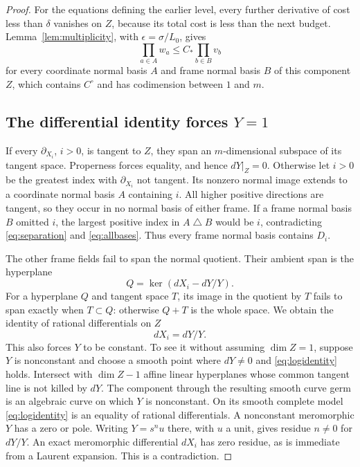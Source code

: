 \documentclass[11pt]{article}
\theoremstyle{definition}
\theoremstyle{remark}
\numberwithin{equation}{section}
\begin{document}
\begin{proof}
For the equations defining the earlier level, every further derivative
of cost less than \(\delta\) vanishes on \(Z\), because its total
cost is less than the next budget. Lemma~\ref{lem:multiplicity}, with
\(\epsilon=\sigma/L_0\), gives
\begin{equation}\label{eq:allbases}
 \prod_{a\in A}w_a\le C_*\prod_{b\in B}v_b
\end{equation}
for every coordinate normal basis \(A\) and frame normal basis \(B\)
of this component \(Z\), which contains \(C^\circ\) and has codimension
between \(1\) and \(m\).

\subsection*{The differential identity forces \(Y=1\)}
If every \(\partial_{X_i}\), \(i>0\), is tangent to \(Z\), they
span an \(m\)-dimensional subspace of its tangent space. Properness
forces equality, and hence \(dY|_Z=0\).
Otherwise let \(i>0\) be the greatest index with
\(\partial_{X_i}\) not tangent. Its nonzero normal image extends to
a coordinate normal basis \(A\) containing \(i\). All higher positive
directions are tangent, so they occur in no normal basis of either
frame. If a frame normal basis \(B\) omitted \(i\), the largest
positive index in \(A\mathbin\triangle B\) would be \(i\), contradicting
\eqref{eq:separation} and \eqref{eq:allbases}. Thus every frame normal
basis contains \(D_i\).

The other frame fields fail to span the normal quotient. Their ambient
span is the hyperplane
\[
 Q=\ker(dX_i-dY/Y).
\]
For a hyperplane \(Q\) and tangent space \(T\), its image in the
quotient by \(T\) fails to span exactly when \(T\subset Q\): otherwise
\(Q+T\) is the whole space. We obtain the identity of rational
differentials on \(Z\)
\begin{equation}\label{eq:logidentity}
 dX_i=dY/Y.
\end{equation}
This also forces \(Y\) to be constant. To see it without assuming
\(\dim Z=1\), suppose \(Y\) is nonconstant and choose a smooth point
where \(dY\ne0\) and \eqref{eq:logidentity} holds. Intersect with
\(\dim Z-1\) affine linear hyperplanes whose common tangent line
is not killed by \(dY\). The component through the resulting smooth
curve germ is an algebraic curve on which \(Y\) is nonconstant.
On its smooth complete model \eqref{eq:logidentity} is an equality
of rational differentials. A nonconstant meromorphic \(Y\) has a
zero or pole. Writing \(Y=s^nu\) there, with \(u\) a unit, gives
residue \(n\ne0\) for \(dY/Y\). An exact meromorphic differential
\(dX_i\) has zero residue, as is immediate from a Laurent expansion.
This is a contradiction.


\end{proof}
\end{document}
